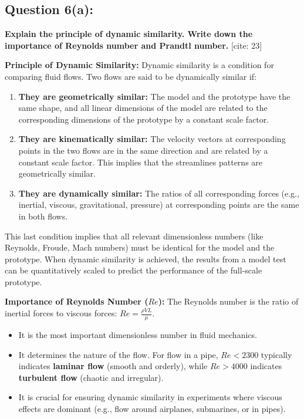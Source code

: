 \documentclass{article}
\begin{document}
\subsection*{\textbf{Question 6(a):}}
\textbf{Explain the principle of dynamic similarity. Write down the importance of Reynolds number and Prandtl number.} [cite: 23]

\textbf{Principle of Dynamic Similarity:}
Dynamic similarity is a condition for comparing fluid flows. Two flows are said to be dynamically similar if:
\begin{enumerate}
    \item \textbf{They are geometrically similar:} The model and the prototype have the same shape, and all linear dimensions of the model are related to the corresponding dimensions of the prototype by a constant scale factor.
    \item \textbf{They are kinematically similar:} The velocity vectors at corresponding points in the two flows are in the same direction and are related by a constant scale factor. This implies that the streamlines patterns are geometrically similar.
    \item \textbf{They are dynamically similar:} The ratios of all corresponding forces (e.g., inertial, viscous, gravitational, pressure) at corresponding points are the same in both flows.
\end{enumerate}
This last condition implies that all relevant dimensionless numbers (like Reynolds, Froude, Mach numbers) must be identical for the model and the prototype. When dynamic similarity is achieved, the results from a model test can be quantitatively scaled to predict the performance of the full-scale prototype.

\textbf{Importance of Reynolds Number ($Re$):}
The Reynolds number is the ratio of inertial forces to viscous forces: $Re = \frac{\rho V L}{\mu}$.
\begin{itemize}
    \item It is the most important dimensionless number in fluid mechanics.
    \item It determines the nature of the flow. For flow in a pipe, $Re < 2300$ typically indicates \textbf{laminar flow} (smooth and orderly), while $Re > 4000$ indicates \textbf{turbulent flow} (chaotic and irregular).
    \item It is crucial for ensuring dynamic similarity in experiments where viscous effects are dominant (e.g., flow around airplanes, submarines, or in pipes).
\end{itemize}
\end{document}
